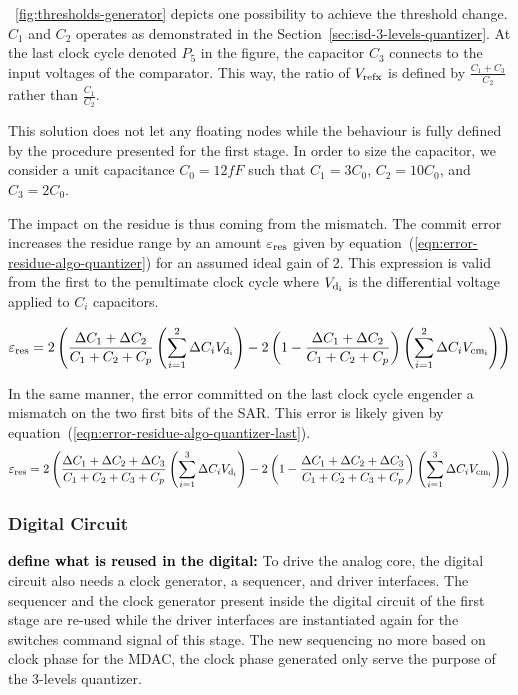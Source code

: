 \figurename~\ref{fig:thresholds-generator} depicts one possibility to achieve the threshold change. \(C_1\) and \(C_2\) operates as demonstrated in the Section~\ref{sec:isd-3-levels-quantizer}. At the last clock cycle denoted \(P_5\) in the figure, the capacitor \(C_3\) connects to the input voltages of the comparator. This way, the ratio of \(V_{\rm refx}\) is defined by \(\frac{C_1+C_3}{C_2}\) rather than \(\frac{C_1}{C_2}\).

This solution does not let any floating nodes while the behaviour is fully defined by the procedure presented for the first stage. In order to size the capacitor, we consider a unit capacitance \(C_0 = 12 fF\) such that \(C_1 = 3 C_0\), \(C_2 = 10 C_0\), and \(C_3 = 2 C_0\).

The impact on the residue is thus coming from the mismatch. The commit error increases the residue range by an amount \(\varepsilon_{\rm res}\) given by equation~(\ref{eqn:error-residue-algo-quantizer}) for an assumed ideal gain of 2. This expression is valid from the first to the penultimate clock cycle where \(V_{\rm d_i}\) is the differential voltage applied to \(C_i\) capacitors.

\begin{equation}
	\label{eqn:error-residue-algo-quantizer}
	\varepsilon_{\rm res} = 2\left(\frac{\Delta C_1 + \Delta C_2}{C_1+C_2+C_p}\left(\sum_{i=1}^{2}{\Delta C_i V_{\rm d_i}}\right)
	- 2\left(1-\frac{\Delta C_1 + \Delta C_2}{C_1+C_2+C_p}\right)\left(\sum_{i=1}^{2}{\Delta C_i V_{\rm cm_i}}\right)\right)
\end{equation}

In the same manner, the error committed on the last clock cycle engender a mismatch on the two first bits of the SAR\@. This error is likely given by equation~(\ref{eqn:error-residue-algo-quantizer-last}).
\begin{equation}
	\label{eqn:error-residue-algo-quantizer-last}
	\varepsilon_{\rm res} = 2\left(\frac{\Delta C_1 + \Delta C_2 + \Delta C_3}{C_1+C_2+C_3+C_p}\left(\sum_{i=1}^{3}{\Delta C_i V_{\rm d_i}}\right)
	- 2\left(1-\frac{\Delta C_1 + \Delta C_2 + \Delta C_3}{C_1+C_2+C_3+C_p}\right)\left(\sum_{i=1}^{3}{\Delta C_i V_{\rm cm_i}}\right)\right)
\end{equation}

	\subsubsection{Digital Circuit}         %
\textbf{\textcolor{black}{define what is reused in the digital:}}
To drive the analog core, the digital circuit also needs a clock generator, a sequencer, and driver interfaces. The sequencer and the clock generator present inside the digital circuit of the first stage are re-used while the driver interfaces are instantiated again for the switches command signal of this stage. The new sequencing no more based on clock phase for the MDAC, the clock phase generated only serve the purpose of the 3-levels quantizer.

